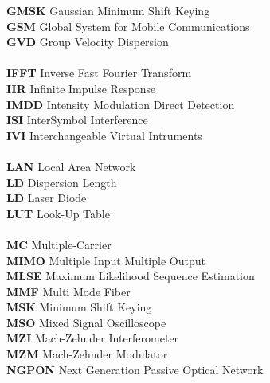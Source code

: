 \begin{multicols}{2}
\begin{tabbing}
\textbf{GMSK}		\>	Gaussian Minimum Shift Keying					\\
\textbf{GSM}		\>	Global System for Mobile Communications			\\
\textbf{GVD}		\>	Group Velocity Dispersion						\\
\\
\textbf{IFFT}		\>	Inverse Fast Fourier Transform					\\
\textbf{IIR}		\>	Infinite Impulse Response						\\
\textbf{IMDD}		\>	Intensity Modulation Direct Detection			\\
\textbf{ISI}		\>	InterSymbol Interference						\\
\textbf{IVI}		\>	Interchangeable Virtual Intruments				\\
\\
\textbf{LAN}		\>	Local Area Network								\\
\textbf{LD}			\>	Dispersion Length								\\
\textbf{LD}			\>	Laser Diode										\\
\textbf{LUT}		\>	Look-Up Table									\\
\\
\textbf{MC}			\>	Multiple-Carrier								\\
\textbf{MIMO}		\>	Multiple Input Multiple Output					\\
\textbf{MLSE}		\>	Maximum Likelihood Sequence Estimation			\\
\textbf{MMF}		\>	Multi Mode Fiber								\\
\textbf{MSK}		\>	Minimum Shift Keying							\\
\textbf{MSO}		\>	Mixed Signal Oscilloscope						\\
\textbf{MZI}		\>	Mach-Zehnder Interferometer						\\
\textbf{MZM}		\>	Mach-Zehnder Modulator							\\
\textbf{NGPON}		\>	Next Generation Passive Optical Network			\\

\end{tabbing}
\end{multicols}
